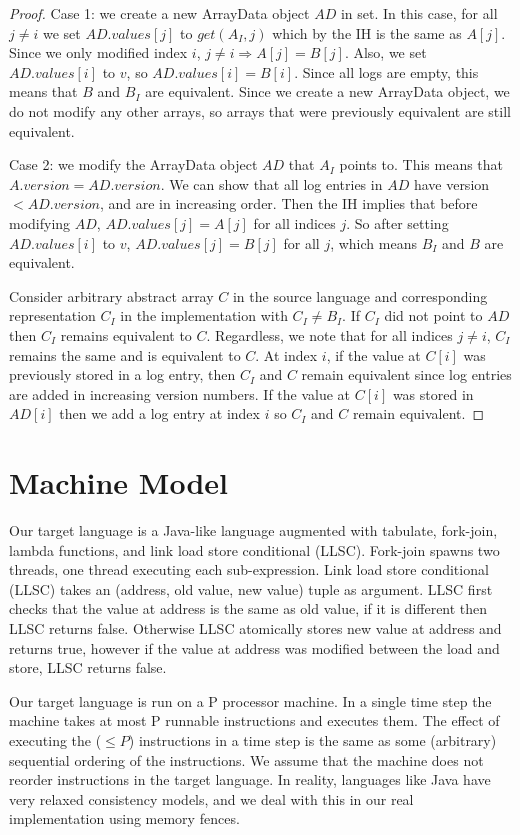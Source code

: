 \documentclass[preprint]{sigplanconf}
\begin{document}
\begin{proof}
Case 1: we create a new ArrayData object $AD$ in set. In this case, for all $j \neq i$ we set $AD.values[j]$ to $get(A_I, j)$ which by the IH is the same as $A[j]$. Since we only modified index $i$, $j \neq i \Rightarrow A[j] = B[j]$. Also, we set $AD.values[i]$ to $v$, so $AD.values[i] = B[i]$. Since all logs are empty, this means that $B$ and $B_I$ are equivalent. Since we create a new ArrayData object, we do not modify any other arrays, so arrays that were previously equivalent are still equivalent.

Case 2: we modify the ArrayData object $AD$ that $A_I$ points to. This means that $A.version = AD.version$. We can show that all log entries in $AD$ have version $< AD.version$, and are in increasing order. Then the IH implies that before modifying $AD$, $AD.values[j] = A[j]$ for all indices $j$. So after setting $AD.values[i]$ to $v$, $AD.values[j] = B[j]$ for all $j$, which means $B_I$ and $B$ are equivalent.

Consider arbitrary abstract array $C$ in the source language and corresponding representation $C_I$ in the implementation with $C_I \neq B_I$. If $C_I$ did not point to $AD$ then $C_I$ remains equivalent to $C$. Regardless, we note that for all indices $j \neq i$, $C_I$ remains the same and is equivalent to $C$. At index $i$, if the value at $C[i]$ was previously stored in a log entry, then $C_I$ and $C$ remain equivalent since log entries are added in increasing version numbers. If the value at $C[i]$ was stored in $AD[i]$ then we add a log entry at index $i$ so $C_I$ and $C$ remain equivalent.

\end{proof}

\section{Machine Model}

Our target language is a Java-like language augmented with tabulate, fork-join, lambda functions, and link load store conditional (LLSC). Fork-join spawns two threads, one thread executing each sub-expression. Link load store conditional (LLSC) takes an (address, old value, new value) tuple as argument. LLSC first checks that the value at address is the same as old value, if it is different then LLSC returns false. Otherwise LLSC atomically stores new value at address and returns true, however if the value at address was modified between the load and store, LLSC returns false.

Our target language is run on a P processor machine. In a single time step the machine takes at most P runnable instructions and executes them.  The effect of executing the ($\leq P$) instructions in a time step is the same as some (arbitrary) sequential ordering of the instructions. We assume that the machine does not reorder instructions in the target language. In reality, languages like Java have very relaxed consistency models, and we deal with this in our real implementation using memory fences.
\end{document}
